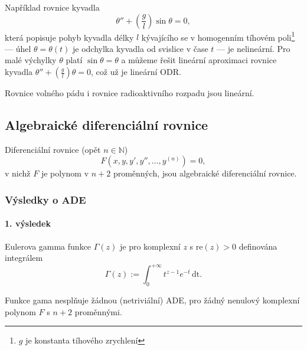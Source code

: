 \documentclass[../main.tex]{subfiles}
\begin{document}
\begin{example}
    Například rovnice kyvadla
    \[ \theta'' + \left(\frac{g}{l}\right)\sin\theta = 0, \]
    která popisuje pohyb kyvadla délky $l$ kývajícího se v homogenním tíhovém poli\footnote{$g$ je konstanta tíhového zrychlení}
    --- úhel $\theta = \theta(t)$ je odchylka kyvadla od svislice v čase $t$ --- je nelineární.
    Pro malé výchylky $\theta$ platí $\sin \theta = \theta$ a můžeme řešit lineární aproximaci rovnice kyvadla
    $\theta'' + \left(\frac{g}{l}\right)\theta = 0$, což už je lineární ODR.
\end{example}

\begin{remark}
    Rovnice volného pádu i rovnice radioaktivního rozpadu jsou lineární.
\end{remark}

\subsection{Algebraické diferenciální rovnice}

\begin{definition}
    Diferenciální rovnice (opět $n \in \mathbb{N}$)
    \[ F(x,y,y',y'',\dots,y^{(n)}) = 0, \]
    v nichž $F$ je polynom v $n+2$ proměnných, jsou algebraické diferenciální rovnice.
\end{definition}

\subsubsection{Výsledky o ADE}

\paragraph{1. výsledek}

\begin{example}
    Eulerova gamma funkce $\Gamma(z)$ je pro komplexní $z$ s $\text{re}(z)>0$
    definována integrálem
    \[ \Gamma(z) := \int_{0}^{+\infty} t^{z-1}e^{-t}\,\text{dt}. \]
\end{example}

\begin{theorem}[Hölder]
    Funkce gama nesplňuje žádnou (netriviální) ADE, pro žádný nenulový komplexní
    polynom $F$ s $n+2$ proměnnými.
\end{theorem}
\end{document}
